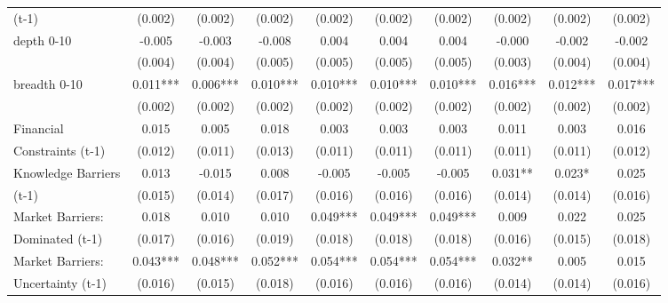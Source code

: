 \begin{table}[htbp]
\begin{tabular}{l*{9}{c}}
(t-1)               &     (0.002)   &     (0.002)   &     (0.002)   &     (0.002)   &     (0.002)   &     (0.002)   &     (0.002)   &     (0.002)   &     (0.002)   \\
depth 0-10          &      -0.005   &      -0.003   &      -0.008   &       0.004   &       0.004   &       0.004   &      -0.000   &      -0.002   &      -0.002   \\
                    &     (0.004)   &     (0.004)   &     (0.005)   &     (0.005)   &     (0.005)   &     (0.005)   &     (0.003)   &     (0.004)   &     (0.004)   \\
breadth 0-10        &       0.011***&       0.006***&       0.010***&       0.010***&       0.010***&       0.010***&       0.016***&       0.012***&       0.017***\\
                    &     (0.002)   &     (0.002)   &     (0.002)   &     (0.002)   &     (0.002)   &     (0.002)   &     (0.002)   &     (0.002)   &     (0.002)   \\
Financial           &       0.015   &       0.005   &       0.018   &       0.003   &       0.003   &       0.003   &       0.011   &       0.003   &       0.016   \\
Constraints (t-1)   &     (0.012)   &     (0.011)   &     (0.013)   &     (0.011)   &     (0.011)   &     (0.011)   &     (0.011)   &     (0.011)   &     (0.012)   \\
Knowledge Barriers  &       0.013   &      -0.015   &       0.008   &      -0.005   &      -0.005   &      -0.005   &       0.031** &       0.023*  &       0.025   \\
(t-1)               &     (0.015)   &     (0.014)   &     (0.017)   &     (0.016)   &     (0.016)   &     (0.016)   &     (0.014)   &     (0.014)   &     (0.016)   \\
Market Barriers:    &       0.018   &       0.010   &       0.010   &       0.049***&       0.049***&       0.049***&       0.009   &       0.022   &       0.025   \\
Dominated (t-1)     &     (0.017)   &     (0.016)   &     (0.019)   &     (0.018)   &     (0.018)   &     (0.018)   &     (0.016)   &     (0.015)   &     (0.018)   \\
Market Barriers:    &       0.043***&       0.048***&       0.052***&       0.054***&       0.054***&       0.054***&       0.032** &       0.005   &       0.015   \\
Uncertainty (t-1)   &     (0.016)   &     (0.015)   &     (0.018)   &     (0.016)   &     (0.016)   &     (0.016)   &     (0.014)   &     (0.014)   &     (0.016)   \\

\end{tabular}
\end{table}
